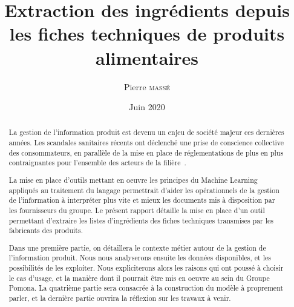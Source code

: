 \documentclass{report}
\title{Extraction des ingrédients depuis les fiches techniques de produits alimentaires}
\author{Pierre \textsc{massé}}
\date{Juin 2020}
\begin{document}
\maketitle

\large
\begin{abstract}   
    
    La gestion de l'information produit est devenu un enjeu de société majeur ces dernières années.
    Les scandales sanitaires récents ont déclenché une prise de conscience collective des consommateurs, en parallèle de la mise en place de réglementations de plus en plus contraignantes pour l'ensemble des acteurs de la filière~\cite{incotext}\cite{incoexpl}.


    La mise en place d'outils mettant en oeuvre les principes du Machine Learning appliqués au traitement du langage permettrait d'aider les opérationnels de la gestion de l'information à interpréter plus vite et mieux les documents mis à disposition par les fournisseurs du groupe.
    Le présent rapport détaille la mise en place d'un outil permettant d'extraire les listes d'ingrédients des fiches techniques transmises par les fabricants des produits.

    Dans une première partie, on détaillera le contexte métier autour de la gestion de l'information produit. 
    Nous nous analyserons ensuite les données disponibles, et les possibilités de les exploiter.
    Nous expliciterons alors les raisons qui ont poussé à choisir le cas d'usage, et la manière dont il pourrait être mis en oeuvre au sein du Groupe Pomona.
    La quatrième partie sera consacrée à la construction du modèle à proprement parler, et la dernière partie ouvrira la réflexion sur les travaux à venir.


\end{abstract}
\normalsize

\tableofcontents










\end{document}
